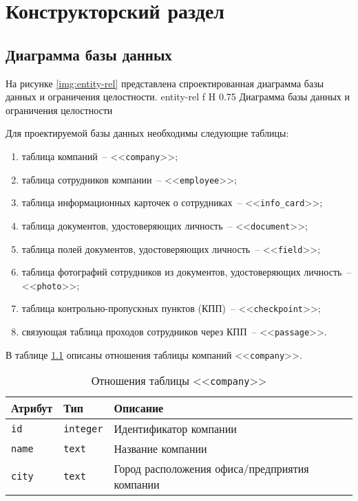 \chapter{Конструкторский раздел}
	
\section{Диаграмма базы данных}

На рисунке \ref{img:entity-rel} представлена спроектированная диаграмма базы данных и ограничения целостности.
	{entity-rel}
	{f}
	{H}
	{0.75\textwidth}
	{Диаграмма базы данных и ограничения целостности}
	
\clearpage

Для проектируемой базы данных необходимы следующие таблицы:
\begin{enumerate}
	\item таблица компаний~-- <<\texttt{company}>>;
	\item таблица сотрудников компании~-- <<\texttt{employee}>>;
	\item таблица информационных карточек о сотрудниках~-- <<\texttt{info\_card}>>;
	\item таблица документов, удостоверяющих личность~-- <<\texttt{document}>>;
	\item таблица полей документов, удостоверяющих личность~-- <<\texttt{field}>>;
	\item таблица фотографий сотрудников из документов, удостоверяющих личность~-- <<\texttt{photo}>>;
	\item таблица контрольно-пропускных пунктов (КПП)~-- <<\texttt{checkpoint}>>;
	\item связующая таблица проходов сотрудников через КПП~-- <<\texttt{passage}>>.
\end{enumerate}

В таблице \ref{table:companyCols} описаны отношения таблицы компаний <<\texttt{company}>>.
\begin{table}[h!]
	\begin{center}
		\caption{\label{table:companyCols} Отношения таблицы <<\texttt{company}>>}
		\begin{tabularx}{\textwidth}{|X|X|X|}
			\hline
			Атрибут & Тип & Описание \\ \hline
			\texttt{id} & \texttt{integer} & Идентификатор компании \\ \hline
			\texttt{name} & \texttt{text} & Название компании \\ \hline
			\texttt{city} & \texttt{text} & Город расположения офиса/предприятия компании \\ \hline
		\end{tabularx}
	\end{center}
\end{table}

